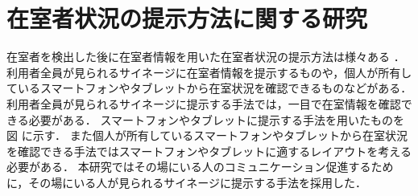 \section{在室者状況の提示方法に関する研究}\label{2.3}
在室者を検出した後に在室者情報を用いた在室者状況の提示方法は様々ある
\cite{picture}
\cite{iptelephone}
\cite{staycomment}
\cite{kasika}
\cite{zaiseki}．
利用者全員が見られるサイネージに在室者情報を提示するものや，個人が所有しているスマートフォンやタブレットから在室状況を確認できるものなどがある．
利用者全員が見られるサイネージに提示する手法では，一目で在室情報を確認できる必要がある．
スマートフォンやタブレットに提示する手法を用いたものを図
に示す．
また個人が所有しているスマートフォンやタブレットから在室状況を確認できる手法ではスマートフォンやタブレットに適するレイアウトを考える必要がある．
本研究ではその場にいる人のコミュニケーション促進するために，その場にいる人が見られるサイネージに提示する手法を採用した．

